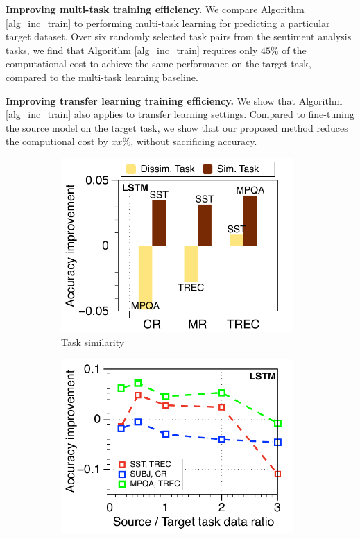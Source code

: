 \textbf{Improving multi-task training efficiency.}
We compare Algorithm \ref{alg_inc_train} to performing multi-task learning for predicting a particular target dataset.
Over six randomly selected task pairs from the sentiment analysis tasks, we find that Algorithm \ref{alg_inc_train} requires only $45\%$ of the computational cost to achieve the same performance on the target task, compared to the multi-task learning baseline.

\textbf{Improving transfer learning training efficiency.}
We show that Algorithm \ref{alg_inc_train} also applies to transfer learning settings.
Compared to fine-tuning the source model on the target task, we show that our proposed method reduces the computional cost by \alert{$xx\%$}, without sacrificing accuracy.

\begin{figure}[!t]
	\centering
	\begin{subfigure}[b]{0.33\textwidth}
		\centering
		\includegraphics[width=0.975\textwidth]{figures/task_sim_norm_lstm.pdf}
		\caption{Task similarity}
		\label{fig_ab_sim}
	\end{subfigure}%
	\begin{subfigure}[b]{0.33\textwidth}
		\centering
		\includegraphics[width=0.975\textwidth]{figures/ratio_norm_3_pairs_lstm.pdf}

\end{subfigure}
\end{figure}
